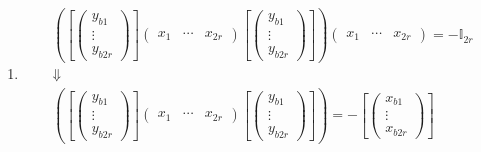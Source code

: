 \documentclass[aps,preprint]{revtex4}
\begin{document}
\begin{enumerate}
\item 
\begin{gather}
\left( \overset{}{\left[ \left( 
\begin{array}{c}
y_{b1} \\ 
\vdots \\ 
y_{b2r}%
\end{array}%
\right) \right] \left( 
\begin{array}{ccc}
x_{1} & \cdots & x_{2r}%
\end{array}%
\right) \left[ \left( 
\begin{array}{c}
y_{b1} \\ 
\vdots \\ 
y_{b2r}%
\end{array}%
\right) \right] }\right) \left( 
\begin{array}{ccc}
x_{1} & \cdots & x_{2r}%
\end{array}%
\right) =-\mathbb{I}_{2r} \\
\Downarrow \\
\left( \overset{}{\left[ \left( 
\begin{array}{c}
y_{b1} \\ 
\vdots \\ 
y_{b2r}%
\end{array}%
\right) \right] \left( 
\begin{array}{ccc}
x_{1} & \cdots & x_{2r}%
\end{array}%
\right) \left[ \left( 
\begin{array}{c}
y_{b1} \\ 
\vdots \\ 
y_{b2r}%
\end{array}%
\right) \right] }\right) =-\left[ \left( 
\begin{array}{c}
x_{b1} \\ 
\vdots \\ 
x_{b2r}%
\end{array}%
\right) \right]
\end{gather}


\end{enumerate}
\end{document}
